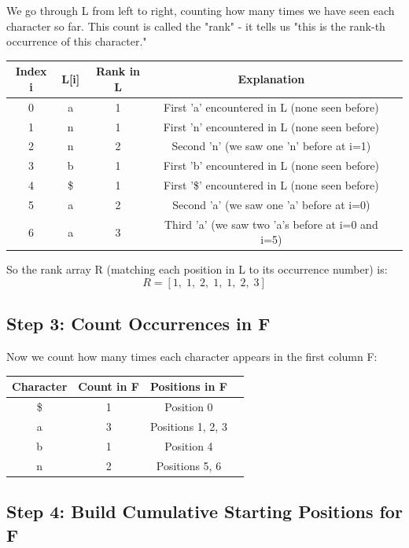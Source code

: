 \begin{examplebox}
We go through L from left to right, counting how many times we have seen each character so far. This count is called the "rank" - it tells us "this is the rank-th occurrence of this character."

\begin{center}
\begin{tabular}{|c|c|c|c|p{6cm}|}
\hline
\textbf{Index i} & \textbf{L[i]} & \textbf{Rank in L} & \textbf{Explanation} \\
\hline
0 & a & 1 & First 'a' encountered in L (none seen before) \\
1 & n & 1 & First 'n' encountered in L (none seen before) \\
2 & n & 2 & Second 'n' (we saw one 'n' before at i=1) \\
3 & b & 1 & First 'b' encountered in L (none seen before) \\
4 & \$ & 1 & First '\$' encountered in L (none seen before) \\
5 & a & 2 & Second 'a' (we saw one 'a' before at i=0) \\
6 & a & 3 & Third 'a' (we saw two 'a's before at i=0 and i=5) \\
\hline
\end{tabular}
\end{center}

So the rank array R (matching each position in L to its occurrence number) is:
\[
R = [1,\; 1,\; 2,\; 1,\; 1,\; 2,\; 3]
\]

\subsection*{Step 3: Count Occurrences in F}

Now we count how many times each character appears in the first column F:

\begin{center}
\begin{tabular}{|c|c|c|p{5cm}|}
\hline
\textbf{Character} & \textbf{Count in F} & \textbf{Positions in F} \\
\hline
\$ & 1 & Position 0 \\
a & 3 & Positions 1, 2, 3 \\
b & 1 & Position 4 \\
n & 2 & Positions 5, 6 \\
\hline
\end{tabular}
\end{center}

\subsection*{Step 4: Build Cumulative Starting Positions for F}


\end{examplebox}
